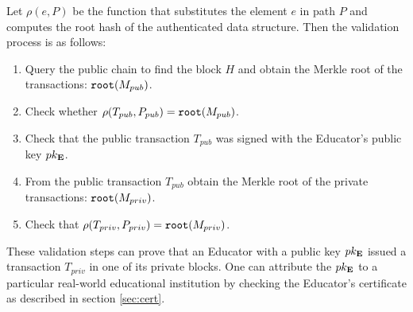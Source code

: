 Let $\rho(e, P)$ be the function that substitutes the element $e$ in path $P$ and computes the root hash of the authenticated data structure. Then the validation process is as follows:
\begin{enumerate}
\item Query the public chain to find the block $H$ and obtain the Merkle root of the transactions: $\mathtt{root}(M_{pub})$.
\item Check whether $\rho(T_{pub}, P_{pub}) = \mathtt{root}(M_{pub})$.
\item Check that the public transaction $T_{pub}$ was signed with the Educator's public key $pk_{\mathbf{E}}$.
\item From the public transaction $T_{pub}$ obtain the Merkle root of the private transactions: $\mathtt{root}(M_{priv})$.
\item Check that $\rho(T_{priv}, P_{priv}) = \mathtt{root}(M_{priv})$.
\end{enumerate}

These validation steps can prove that an Educator with a public key $pk_{\mathbf{E}}$ issued a transaction $T_{priv}$ in one of its private blocks. One can attribute the $pk_{\mathbf{E}}$ to a particular real-world educational institution by checking the Educator's certificate as described in section \ref{sec:cert}.
